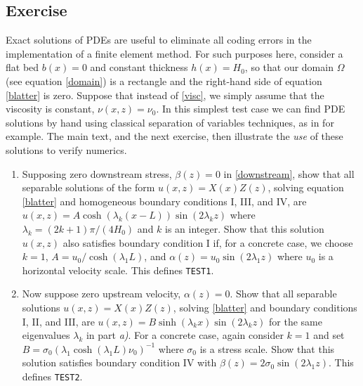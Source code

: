 \documentclass[11pt,final,reqno]{amsart}
\theoremstyle{remark}
\theoremstyle{definition}
\newcommand{\TESTONE}{\texttt{TEST1}\xspace}
\newcommand{\TESTTWO}{\texttt{TEST2}\xspace}
\begin{document}
\subsection{Exercise}  \label{exer:constantseparable}  Exact solutions of PDEs are useful to eliminate all coding errors in the implementation of a finite element method.  For such purposes here, consider a flat bed $b(x)=0$ and constant thickness $h(x)=H_0$, so that our domain $\Omega$ (see equation \eqref{domain}) is a rectangle and the right-hand side of equation \eqref{blatter} is zero.  Suppose that instead of \eqref{visc}, we simply assume that the viscosity is constant, $\nu(x,z)=\nu_0$.  In this simplest test case we can find PDE solutions by hand using classical separation of variables techniques, as in \cite{BrownChurchill} for example.  The main text, and the next exercise, then illustrate the \emph{use} of these solutions to verify numerics.
\begin{enumerate}
\item Supposing zero downstream stress, $\beta(z)=0$ in \eqref{downstream}, show that all separable solutions of the form $u(x,z)=X(x)Z(z)$, solving equation \eqref{blatter} and homogeneous boundary conditions I, III, and IV,  are $u(x,z) = A \cosh(\lambda_k (x-L)) \sin(2 \lambda_k z)$ where $\lambda_k = (2k+1)\pi / (4 H_0)$ and $k$ is an integer.  Show that this solution $u(x,z)$ also satisfies boundary condition I if, for a concrete case, we choose $k=1$, $A=u_0/\cosh(\lambda_1 L)$, and $\alpha(z)=u_0 \sin(2 \lambda_1 z)$ where $u_0$ is a horizontal velocity scale.  This defines \TESTONE.
\item Now suppose zero upstream velocity, $\alpha(z)=0$.  Show that all separable solutions $u(x,z)=X(x)Z(z)$, solving \eqref{blatter} and boundary conditions I, II, and III, are $u(x,z) = B \sinh(\lambda_k x) \sin(2 \lambda_k z)$ for the same eigenvalues $\lambda_k$ in part \emph{a)}.  For a concrete case, again consider $k=1$ and set $B=\sigma_0 \left(\lambda_1 \cosh(\lambda_1 L) \nu_0\right)^{-1}$ where $\sigma_0$ is a stress scale.  Show that this solution satisfies boundary condition IV with $\beta(z) = 2 \sigma_0 \sin(2 \lambda_1 z)$.  This defines \TESTTWO.
\end{enumerate}
\end{document}
